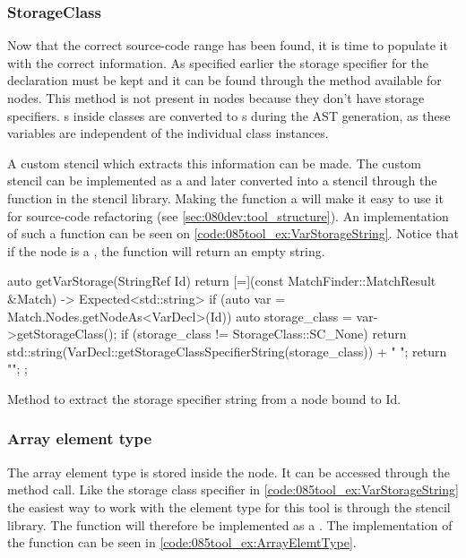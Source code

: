 \subsubsection*{StorageClass}
Now that the correct source-code range has been found, it is time to populate it with the correct information. As specified earlier the storage specifier for the declaration must be kept and it can be found through the  method available for  nodes. This method is not present in  nodes because they don't have storage specifiers.  s inside classes are converted to s during the AST generation, as these variables are independent of the individual class instances. 

A custom stencil which extracts this information can be made. The custom  stencil can be implemented as a  and later converted into a stencil through the  function in the stencil library. Making the function a  will make it easy to use it for source-code refactoring (see \cref{sec:080dev:tool_structure}). An implementation of such a function can be seen on \cref{code:085tool_ex:VarStorageString}.
Notice that if the node is a , the function will return an empty string.

\begin{listing}[H]
    \begin{cppcode}
auto getVarStorage(StringRef Id) {
    return [=](const MatchFinder::MatchResult &Match) -> Expected<std::string> {
        if (auto var = Match.Nodes.getNodeAs<VarDecl>(Id)) {
            auto storage_class = var->getStorageClass();
            if (storage_class != StorageClass::SC_None) {
               return std::string(VarDecl::getStorageClassSpecifierString(storage_class)) + " ";
            }
        }
        return "";
    };
}
    \end{cppcode}
    \caption{Method to extract the storage specifier string from a  node bound to Id.}
    \label{code:085tool_ex:VarStorageString}
\end{listing}

\subsubsection*{Array element type}

The array element type is stored inside the  node. It can be accessed through the  method call. Like the storage class specifier in \cref{code:085tool_ex:VarStorageString} the easiest way to work with the element type for this tool is through the stencil library. The  function will therefore be implemented as a . The implementation of the function can be seen in \cref{code:085tool_ex:ArrayElemtType}. 

